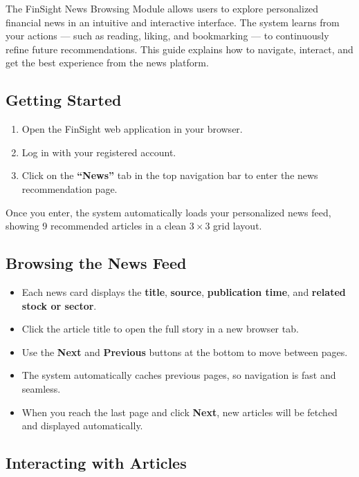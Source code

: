 The FinSight News Browsing Module allows users to explore personalized financial news in an intuitive and interactive interface.  
The system learns from your actions --- such as reading, liking, and bookmarking --- to continuously refine future recommendations.  
This guide explains how to navigate, interact, and get the best experience from the news platform.

\subsection{Getting Started}

\begin{enumerate}
  \item Open the FinSight web application in your browser.
  \item Log in with your registered account.  
  \item Click on the \textbf{“News”} tab in the top navigation bar to enter the news recommendation page.
\end{enumerate}

Once you enter, the system automatically loads your personalized news feed, showing 9 recommended articles in a clean \(3\times3\) grid layout.

\subsection{Browsing the News Feed}

\begin{itemize}
  \item Each news card displays the \textbf{title}, \textbf{source}, \textbf{publication time}, and \textbf{related stock or sector}.
  \item Click the article title to open the full story in a new browser tab.
  \item Use the \textbf{Next} and \textbf{Previous} buttons at the bottom to move between pages.
  \item The system automatically caches previous pages, so navigation is fast and seamless.
  \item When you reach the last page and click \textbf{Next}, new articles will be fetched and displayed automatically.
\end{itemize}

\subsection{Interacting with Articles}

